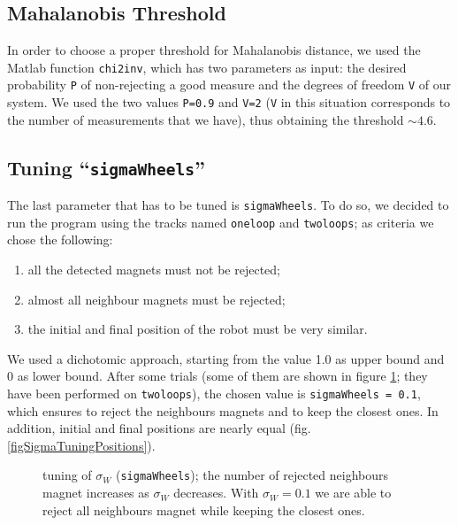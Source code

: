 \subsection{Mahalanobis Threshold}

In order to choose a proper threshold for Mahalanobis distance, we used the Matlab function \texttt{chi2inv}, which has two parameters as input: the desired probability \texttt{P} of non-rejecting a good measure and the degrees of freedom \texttt{V} of our system. We used the two values \texttt{P=0.9} and \texttt{V=2} (\texttt{V} in this situation corresponds to the number of measurements that we have), thus obtaining the threshold $\sim\!4.6$.



\subsection{Tuning ``\texttt{sigmaWheels}''}\label{sectionSigmaWheel}

The last parameter that has to be tuned is \texttt{sigmaWheels}. To do so, we decided to run the program using the tracks named \texttt{oneloop} and \texttt{twoloops}; as criteria we chose the following:

\begin{enumerate}
	\item all the detected magnets must not be rejected;
	\item almost all neighbour magnets must be rejected;
	\item the initial and final position of the robot must be very similar.
\end{enumerate}

We used a dichotomic approach, starting from the value 1.0 as upper bound and 0 as lower bound. After some trials (some of them are shown in figure \ref{figSigmaTuning}; they have been performed on \texttt{twoloops}), the chosen value is \texttt{sigmaWheels = 0.1}, which ensures to reject the neighbours magnets and to keep the closest ones. In addition, initial and final positions are nearly equal (fig. \ref{figSigmaTuningPositions}).

\begin{figure}[htbp]
	\centering
	\caption{tuning of $\sigma_W$ (\texttt{sigmaWheels}); the number of rejected neighbours magnet increases as $\sigma_W$ decreases. With $\sigma_W = 0.1$ we are able to reject all neighbours magnet while keeping the closest ones.}\label{figSigmaTuning}
\end{figure}

